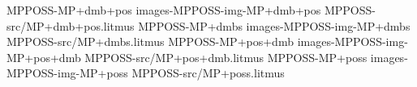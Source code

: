 %
\def\csname MP+dmb+pos@base\endcsname{MPPOSS-MP+dmb+pos}%
\def\csname MP+dmb+pos@img\endcsname{\csname images-MPPOSS-img-MP+dmb+pos\endcsname}%
\def\csname MP+dmb+pos@src\endcsname{MPPOSS-src/MP+dmb+pos.litmus}%
%
\def\csname MP+dmbs@base\endcsname{MPPOSS-MP+dmbs}%
\def\csname MP+dmbs@img\endcsname{\csname images-MPPOSS-img-MP+dmbs\endcsname}%
\def\csname MP+dmbs@src\endcsname{MPPOSS-src/MP+dmbs.litmus}%
%
\def\csname MP+pos+dmb@base\endcsname{MPPOSS-MP+pos+dmb}%
\def\csname MP+pos+dmb@img\endcsname{\csname images-MPPOSS-img-MP+pos+dmb\endcsname}%
\def\csname MP+pos+dmb@src\endcsname{MPPOSS-src/MP+pos+dmb.litmus}%
%
\def\csname MP+poss@base\endcsname{MPPOSS-MP+poss}%
\def\csname MP+poss@img\endcsname{\csname images-MPPOSS-img-MP+poss\endcsname}%
\def\csname MP+poss@src\endcsname{MPPOSS-src/MP+poss.litmus}%
%
\def\MPPOSS{%
\ahref{\base{MP+dmb+pos}.html}{\textsf{MP+dmb+pos}}%
, \ahref{\base{MP+dmbs}.html}{\textsf{MP+dmbs}}%
, \ahref{\base{MP+pos+dmb}.html}{\textsf{MP+pos+dmb}}%
{} and \ahref{\base{MP+poss}.html}{\textsf{MP+poss}}%
}%
\def\applyMPPOSS#1{%
#1{MP+dmb+pos}%
#1{MP+dmbs}%
#1{MP+pos+dmb}%
#1{MP+poss}%
}%
